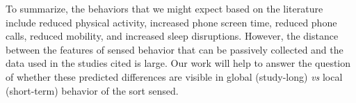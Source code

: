 \vspace{1em}
\noindent
To summarize, the behaviors that we might expect based on the literature include reduced physical activity, increased phone screen time, reduced phone calls, reduced mobility, and increased sleep disruptions. However, the distance between the features of sensed behavior that can be passively collected and the data used in the studies cited is large. Our work will help to answer the question of whether these predicted differences are visible in global (study-long) \textit{vs} local (short-term) behavior of the sort sensed.

